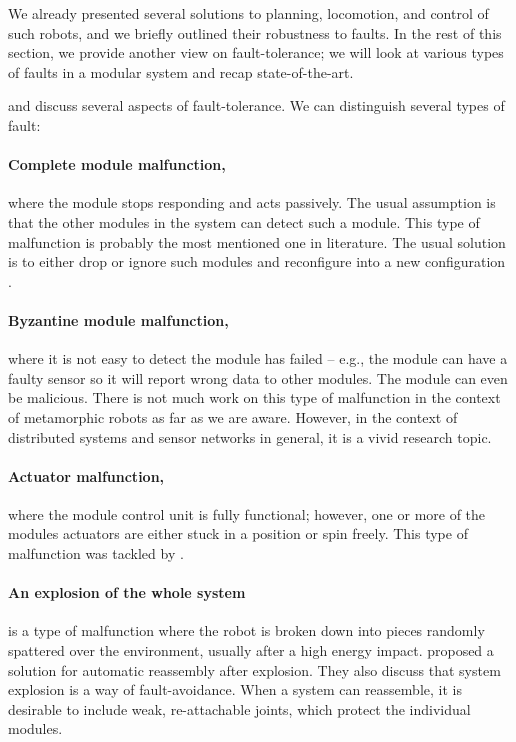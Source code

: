 We already presented several solutions to planning, locomotion, and control of
such robots, and we briefly outlined their robustness to faults. In the rest of
this section, we provide another view on fault-tolerance; we will look at
various types of faults in a modular system and recap state-of-the-art.

\cite{DKbotDistr} and \cite{4141032} discuss several aspects of
fault-tolerance. We can distinguish several types of fault:

\paragraph{Complete module malfunction,} where the module stops responding and
acts passively. The usual assumption is that the other modules in the system can
detect such a module. This type of malfunction is probably the most mentioned
one in literature. The usual solution is to either drop or ignore such
modules and reconfigure into a new configuration \cite{DMotionCoord,
DBLP:conf/ieeealife/Christensen07, DBLP:conf/iros/DaveyKY12}.

\paragraph{Byzantine module malfunction,} where it is not easy to detect the
module has failed -- e.g., the module can have a faulty sensor so it will report
wrong data to other modules. The module can even be malicious. There is not much
work on this type of malfunction in the context of metamorphic robots as far as
we are aware. However, in the context of distributed systems and sensor networks
in general, it is a vivid research topic.

\paragraph{Actuator malfunction,} where the module control unit is fully
functional; however, one or more of the modules actuators are either stuck in a
position or spin freely. This type of malfunction was tackled by
\textcite{DBLP:conf/romoco/VonasekONW15}.

\paragraph{An explosion of the whole system} is a type of malfunction where the
robot is broken down into pieces randomly spattered over the environment, usually
after a high energy impact. \textcite{DBLP:conf/iros/YimSSPDT07a} proposed a
solution for automatic reassembly after explosion. They also discuss that
system explosion is a way of fault-avoidance. When a system can reassemble, it
is desirable to include weak, re-attachable joints, which protect the individual
modules.

